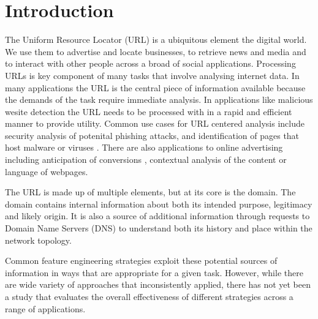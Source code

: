 \documentclass[sigconf]{acmart}
\begin{document}


\maketitle

\section{Introduction}

The Uniform Resource Locator (URL) is a ubiquitous element the digital world. 
We use them to advertise and locate businesses, to retrieve news and media and 
to interact with other people across a broad of social applications.
Processing URLs is key component of many tasks that involve
analysing internet data. In many applications the URL is the central piece of 
information available because the demands of the task require immediate analysis.
In applications like malicious wesite detection the URL needs to be processed with
in a rapid and efficient manner to provide utility\cite{Ma2009b}.
Common use cases for URL centered analysis include security analysis of potenital phishing 
attacks\cite{Basnet2014,Mamun2016,Vazhayil2018}, and identification of pages 
that host malware or viruses \cite{Canali2011,Mamun2016}.
There are also applications to online advertising
including anticipation of conversions \cite{Qiu2020}, contextual analysis of
the content\cite{Kan2005,Baykan2009,Meshkizadeh2010} or language\cite{Baykan2013} of webpages. 

The URL is made up of multiple elements, but at its core is the domain. The domain
contains internal information about both its intended purpose, legitimacy and likely
origin. It is also a source of additional information through requests to Domain Name
Servers (DNS) to understand both its history and place within the network topology.

Common feature engineering strategies exploit these potential sources of information
in ways that are appropriate for a given task. However, while there are wide variety
of approaches that inconsistently applied, there has not yet been a study that evaluates
the overall effectiveness of different strategies across a range of applications.
\end{document}
